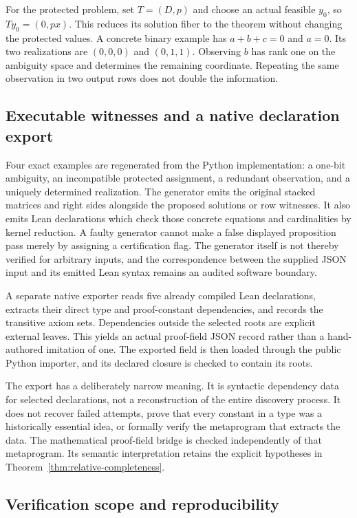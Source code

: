 For the protected problem, set $T=(D,p)$ and choose an actual feasible $y_0$, so $Ty_0=(0,px)$. This reduces its solution fiber to the theorem without changing the protected values. A concrete binary example has $a+b+c=0$ and $a=0$. Its two realizations are $(0,0,0)$ and $(0,1,1)$. Observing $b$ has rank one on the ambiguity space and determines the remaining coordinate. Repeating the same observation in two output rows does not double the information.

\subsection{Executable witnesses and a native declaration export}

Four exact examples are regenerated from the Python implementation: a one-bit ambiguity, an incompatible protected assignment, a redundant observation, and a uniquely determined realization. The generator emits the original stacked matrices and right sides alongside the proposed solutions or row witnesses. It also emits Lean declarations which check those concrete equations and cardinalities by kernel reduction. A faulty generator cannot make a false displayed proposition pass merely by assigning a certification flag. The generator itself is not thereby verified for arbitrary inputs, and the correspondence between the supplied JSON input and its emitted Lean syntax remains an audited software boundary.

A separate native exporter reads five already compiled Lean declarations, extracts their direct type and proof-constant dependencies, and records the transitive axiom sets. Dependencies outside the selected roots are explicit external leaves. This yields an actual proof-field JSON record rather than a hand-authored imitation of one. The exported field is then loaded through the public Python importer, and its declared closure is checked to contain its roots.

The export has a deliberately narrow meaning. It is syntactic dependency data for selected declarations, not a reconstruction of the entire discovery process. It does not recover failed attempts, prove that every constant in a type was a historically essential idea, or formally verify the metaprogram that extracts the data. The mathematical proof-field bridge is checked independently of that metaprogram. Its semantic interpretation retains the explicit hypotheses in Theorem~\ref{thm:relative-completeness}.

\subsection{Verification scope and reproducibility}

